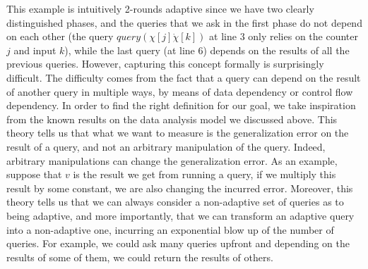 This example is intuitively 2-rounds adaptive since we have two clearly distinguished phases, and the queries that we ask in the first phase do not depend on each other (the query $query(\chi[j]\dot \chi[k])$ at line $3$ only relies on the counter $j$ and input $k$), while the last query 
(at line 6) depends on the results of all the previous queries. 
However, capturing this concept formally is surprisingly difficult. The difficulty comes from the fact that a query can depend on the result of another query in multiple ways, by means of data dependency or control flow dependency. In order to find the right definition for our goal, we take inspiration from the known results on the data analysis model we discussed above. This theory tells us that what we want to measure is the generalization error on the result of a query, and not an arbitrary manipulation of the query. Indeed, arbitrary manipulations can change the generalization error. As an example, suppose that $v$ is the result we get from running a query, if we multiply this result by some constant, we are also changing the incurred error. Moreover, this theory tells us that we can always consider a non-adaptive set of queries as to being adaptive, and more importantly, that we can transform an adaptive query into a non-adaptive one, incurring an exponential blow up of the number of queries. For example, we could ask many queries upfront and depending on the results of some of them, we could return the results of others. 

